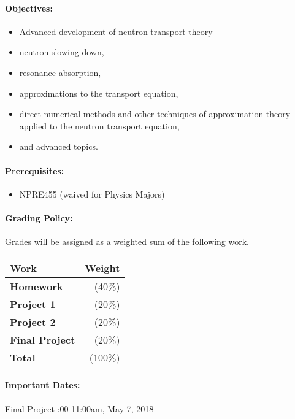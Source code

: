 \documentclass[11pt, a4paper]{article}
\begin{document}
\paragraph{Objectives:}
\begin{itemize}
\item Advanced development of neutron transport theory
\item  neutron slowing-down,
\item resonance absorption,
\item  approximations to the transport equation,
\item  direct numerical methods and other techniques of approximation theory 
        applied to the neutron transport equation,
\item  and advanced topics. 
\end{itemize}

\paragraph{Prerequisites:}
\begin{itemize}
\item NPRE455 (waived for Physics Majors) 
\end{itemize}

\paragraph{Grading Policy:} Grades will be assigned as a weighted sum of the
following work.

\begin{table}[h]
\begin{tabularx}{\textwidth}{Xr}
        \textbf{Work} & \textbf{Weight} \\
\hline
\textbf{Homework}    & (40\%)  \\
\textbf{Project 1}    & (20\%)  \\
\textbf{Project 2}    & (20\%)  \\
\textbf{Final Project}  & (20\%)  \\
\hline
\textbf{Total}       & (100\%)\\
\end{tabularx}
\end{table}

\paragraph{Important Dates:}
\begin{center} \begin{minipage}{3.8in}
\begin{flushleft}
Final Project    :00-11:00am, May 7, 2018\\
\end{flushleft}
\end{minipage}
\end{center}
\end{document}
